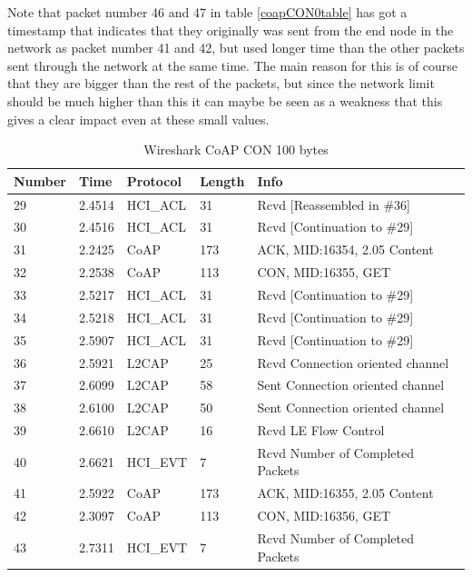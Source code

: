 Note that packet number 46 and 47 in table \ref{coapCON0table} has got a timestamp that indicates that they originally was sent from the end node in the network as packet number 41 and 42, but used longer time than the other packets sent through the network at the same time. The main reason for this is of course that they are bigger than the rest of the packets, but since the network limit should be much higher than this it can maybe be seen as a weakness that this gives a clear impact even at these small values.  


\begin{table}[]
\centering
\caption{Wireshark CoAP CON 100 bytes}
\label{coapCON100table}
\begin{tabular}{lllll}
Number & Time   & Protocol & Length & Info                             \\ \hline
29     & 2.4514 & HCI\_ACL & 31     & Rcvd {[}Reassembled in \#36{]}   \\
30     & 2.4516 & HCI\_ACL & 31     & Rcvd {[}Continuation to \#29{]}  \\
31     & 2.2425 & CoAP     & 173    & ACK, MID:16354, 2.05 Content     \\
32     & 2.2538 & CoAP     & 113    & CON, MID:16355, GET              \\
33     & 2.5217 & HCI\_ACL & 31     & Rcvd {[}Continuation to \#29{]}  \\
34     & 2.5218 & HCI\_ACL & 31     & Rcvd {[}Continuation to \#29{]}  \\
35     & 2.5907 & HCI\_ACL & 31     & Rcvd {[}Continuation to \#29{]}  \\
36     & 2.5921 & L2CAP    & 25     & Rcvd Connection oriented channel \\
37     & 2.6099 & L2CAP    & 58     & Sent Connection oriented channel \\
38     & 2.6100 & L2CAP    & 50     & Sent Connection oriented channel \\
39     & 2.6610 & L2CAP    & 16     & Rcvd LE Flow Control             \\
40     & 2.6621 & HCI\_EVT & 7      & Rcvd Number of Completed Packets \\
41     & 2.5922 & CoAP     & 173    & ACK, MID:16355, 2.05 Content     \\
42     & 2.3097 & CoAP     & 113    & CON, MID:16356, GET              \\ 
43     & 2.7311 & HCI\_EVT & 7      & Rcvd Number of Completed Packets \\ \hline
\end{tabular}
\end{table}

